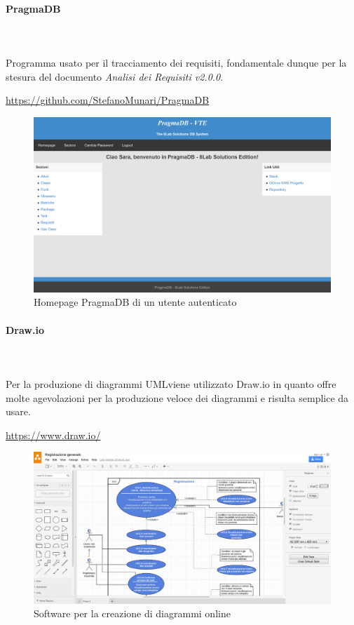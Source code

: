 \paragraph{PragmaDB} \mbox{}\\ \mbox{}\\
Programma usato per il tracciamento dei requisiti, fondamentale dunque per la 
stesura del documento \textit{Analisi dei Requisiti v2.0.0}. \newline
\centerline{\url{https://github.com/StefanoMunari/PragmaDB}}
	\begin{figure}[H]
		\includegraphics[width=0.99\linewidth]{res/images/HomepagePragmaDB.png}
		\caption{Homepage PragmaDB di un utente autenticato}
	\end{figure}
		
\paragraph{Draw.io} \mbox{}\\ \mbox{}\\
Per la produzione di diagrammi UML\glosp viene utilizzato Draw.io in quanto 
offre molte agevolazioni per la produzione veloce dei diagrammi e risulta 
semplice da usare. \newline
\centerline{\url{https://www.draw.io/}}
	\begin{figure}[H]
		\includegraphics[width=0.99\linewidth]{res/images/drawio.jpg}
		\caption{Software per la creazione di diagrammi online}
	\end{figure} 
		
